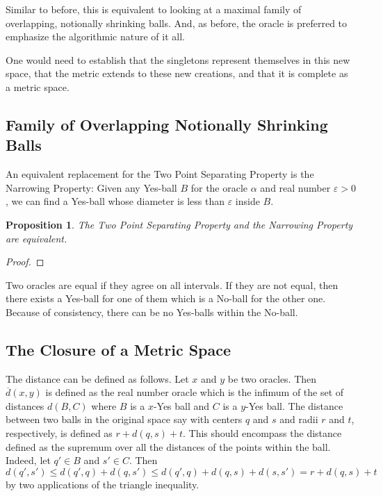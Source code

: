 \documentclass[12pt]{article}
\newtheorem{proposition}{Proposition}
\theoremstyle{remark}
\begin{document}
Similar to before, this is equivalent to looking at a maximal family of overlapping, notionally shrinking balls. And, as before, the oracle is preferred to emphasize the algorithmic nature of it all. 

One would need to establish that the singletons represent themselves in this new space, that the metric extends to these new creations, and that it is complete as a metric space.



\subsection{Family of Overlapping Notionally Shrinking Balls}

An equivalent replacement for the Two Point Separating Property is the Narrowing Property: Given any Yes-ball $B$ for the oracle $\alpha$ and real number $\varepsilon >0$, we can find a Yes-ball whose diameter is less than $\varepsilon$ inside $B$.

\begin{proposition}
    The Two Point Separating Property and the Narrowing Property are equivalent.
\end{proposition}

\begin{proof}
    
\end{proof}


Two oracles are equal if they agree on all intervals. If they are not equal, then there exists a Yes-ball for one of them which is a No-ball for the other one. Because of consistency, there can be no Yes-balls within the No-ball. 


\subsection{The Closure of a Metric Space}

The distance can be defined as follows. Let $x$ and $y$ be two oracles. Then $\overline{d}(x,y)$ is defined as the real number oracle which is the infimum of the set of distances $d(B, C)$ where $B$ is a $x$-Yes ball and $C$ is a $y$-Yes ball. The distance between two balls in the original space say with centers $q$ and $s$ and radii $r$ and $t$, respectively, is defined as $r + d(q,s) + t$. This should encompass the distance defined as the supremum over all the distances of the points within the ball. Indeed, let $q' \in B$ and $s'\in C$. Then $d(q', s') \leq d(q',q) + d(q,s') \leq d(q',q) + d(q,s) + d(s,s') = r + d(q,s) + t$ by two applications of the triangle inequality.  
\end{document}
